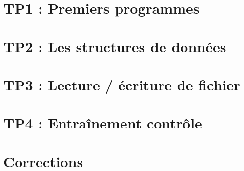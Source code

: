 \documentclass[10pt, a4paper]{article}
\begin{document}
\newpage
\setcounter{tocdepth}{2}
\tableofcontents 

\newpage

\section{TP1 : Premiers programmes}





\newpage
\section{TP2 : Les structures de données}


\newpage
\section{TP3 : Lecture / écriture de fichier}



\newpage
\section{TP4 : Entraînement contrôle}


\newpage
\section{Corrections}


\end{document}
